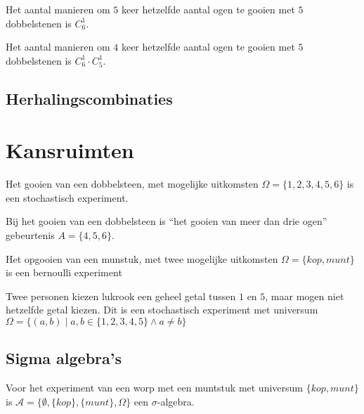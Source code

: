 \documentclass[main.tex]{subfiles}
\begin{document}
\begin{vb}
  Het aantal manieren om $5$ keer hetzelfde aantal ogen te gooien met $5$ dobbelstenen is $C_{6}^{1}$.
\end{vb}

\begin{vb}
  Het aantal manieren om $4$ keer hetzelfde aantal ogen te gooien met $5$ dobbelstenen is $C_{6}^{1}\cdot C_{5}^{1}$.
\end{vb}

\subsection*{Herhalingscombinaties}

\newpage 
\section{Kansruimten}

\begin{vb}
  Het gooien van een dobbelsteen, met mogelijke uitkomsten $\Omega = \{1,2,3,4,5,6\}$ is een stochastisch experiment.
\end{vb}

\begin{vb}
  Bij het gooien van een dobbelsteen is ``het gooien van meer dan drie ogen'' gebeurtenis $A =\{4,5,6\}$.
\end{vb}

\begin{vb}
  Het opgooien van een munstuk, met twee mogelijke uitkomsten $\Omega = \{kop, munt\}$ is een bernoulli experiment
\end{vb}

\begin{vb}
  Twee personen kiezen lukrook een geheel getal tussen $1$ en $5$, maar mogen niet hetzelfde getal kiezen.
  Dit is een stochastisch experiment met universum $\Omega = \{ (a,b) \mid a,b \in \{1,2,3,4,5 \} \wedge a \neq b \}$
\end{vb}

\subsection*{Sigma algebra's}

\begin{vb}
  Voor het experiment van een worp met een muntstuk met universum $\{kop,munt\}$ is $\mathcal{A} = \{ \emptyset, \{kop\}, \{munt\}, \Omega \}$ een $\sigma$-algebra.
\end{vb}
\end{document}
